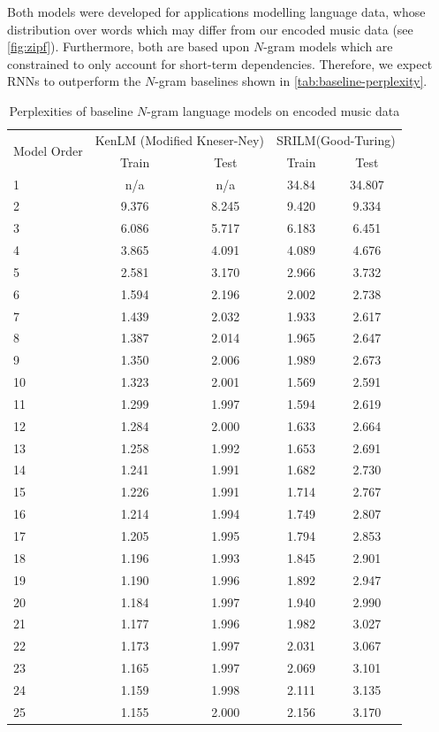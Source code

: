Both models were developed for applications modelling language data, whose distribution
over words which may differ from our encoded music data (see \vref{fig:zipf}).
Furthermore, both are based upon $N$-gram models which are constrained to only
account for short-term dependencies. Therefore, we expect RNNs to outperform the
$N$-gram baselines shown in \vref{tab:baseline-perplexity}.

\begin{table}[p]
  \centering
  \caption{Perplexities of baseline $N$-gram language models on encoded music data}
  \label{tab:baseline-perplexity}
\begin{tabular}{l c c c c}
  \toprule
  \multirow{2}{*}{Model Order} & \multicolumn{2}{c}{KenLM (Modified Kneser-Ney)} & \multicolumn{2}{c}{SRILM(Good-Turing)} \\
  \cmidrule{2-3}
  & Train & Test & Train & Test\\
  \midrule
1  & n/a   & n/a   & 34.84 & 34.807\\
2  & 9.376 & 8.245 & 9.420 & 9.334 \\
3  & 6.086 & 5.717 & 6.183 & 6.451 \\
4  & 3.865 & 4.091 & 4.089 & 4.676 \\
5  & 2.581 & 3.170 & 2.966 & 3.732 \\
6  & 1.594 & 2.196 & 2.002 & 2.738 \\
7  & 1.439 & 2.032 & 1.933 & 2.617 \\
8  & 1.387 & 2.014 & 1.965 & 2.647 \\
9  & 1.350 & 2.006 & 1.989 & 2.673 \\
10 & 1.323 & 2.001 & 1.569 & 2.591 \\
11 & 1.299 & 1.997 & 1.594 & 2.619 \\
12 & 1.284 & 2.000 & 1.633 & 2.664 \\
13 & 1.258 & 1.992 & 1.653 & 2.691 \\
14 & 1.241 & 1.991 & 1.682 & 2.730 \\
15 & 1.226 & 1.991 & 1.714 & 2.767 \\
16 & 1.214 & 1.994 & 1.749 & 2.807 \\
17 & 1.205 & 1.995 & 1.794 & 2.853 \\
18 & 1.196 & 1.993 & 1.845 & 2.901 \\
19 & 1.190 & 1.996 & 1.892 & 2.947 \\
20 & 1.184 & 1.997 & 1.940 & 2.990 \\
21 & 1.177 & 1.996 & 1.982 & 3.027 \\
22 & 1.173 & 1.997 & 2.031 & 3.067 \\
23 & 1.165 & 1.997 & 2.069 & 3.101 \\
24 & 1.159 & 1.998 & 2.111 & 3.135 \\
25 & 1.155 & 2.000 & 2.156 & 3.170 \\
  \bottomrule
\end{tabular}
\end{table}

